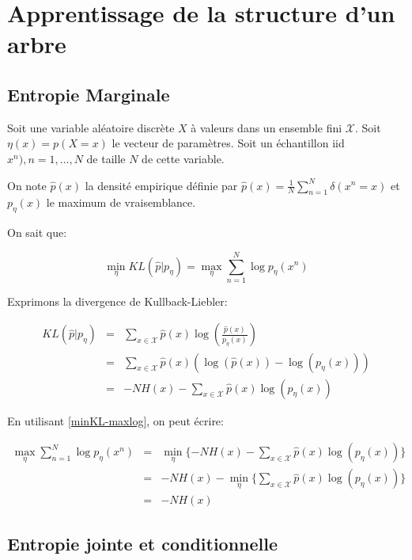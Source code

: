 \documentclass{article}
\begin{document}
\section{Apprentissage de la structure d'un arbre}


\subsection{Entropie Marginale}

Soit une variable aléatoire discrète $X$ à valeurs dans un ensemble fini
$\mathcal{X}$. Soit $\eta(x) = p(X =x)$ le vecteur de paramètres. Soit un
échantillon iid $x^n), n=1, \dots, N$ de taille $N$ de cette variable.

On note $\hat{p}(x)$ la densité empirique définie par $\hat{p}(x) =
\frac{1}{N} \sum_{n=1}^N \delta(x^n = x)$ et $p_{\eta}(x)$ le maximum de vraisemblance.

On sait que:

\begin{equation}
\label{minKL-maxlog}
\min_{\eta} KL(\hat{p}|p_{\eta}) = \max_{\eta} \sum_{n = 1}^N \log p_{\eta}(x^n)
\end{equation}

Exprimons la divergence de Kullback-Liebler:

\begin{align}
KL(\hat{p}|p_{\eta}) & = & \sum_{x \in \mathcal{X}} \hat{p}(x) \log(\frac{\hat{p}(x)}{p_{\eta}(x)}) \\
		     & = & \sum_{x \in \mathcal{X}} \hat{p}(x) (\log(\hat{p}(x)) - \log(p_{\eta}(x))) \\
		     & = & - NH(x) - \sum_{x \in \mathcal{X}} \hat{p}(x) \log(p_{\eta}(x))
\end{align}

En utilisant \ref{minKL-maxlog}, on peut écrire:

\begin{align}
\max_{\eta} \sum_{n = 1}^N \log p_{\eta}(x^n) & = & \min_{\eta} \{- NH(x) - \sum_{x \in \mathcal{X}} \hat{p}(x) \log(p_{\eta}(x))\} \\
					      & = & - NH(x) - \min_{\eta} \{\sum_{x \in \mathcal{X}} \hat{p}(x) \log(p_{\eta}(x))\} \\
					      & = & - NH(x)
\end{align}

\subsection{Entropie jointe et conditionnelle}
\end{document}
